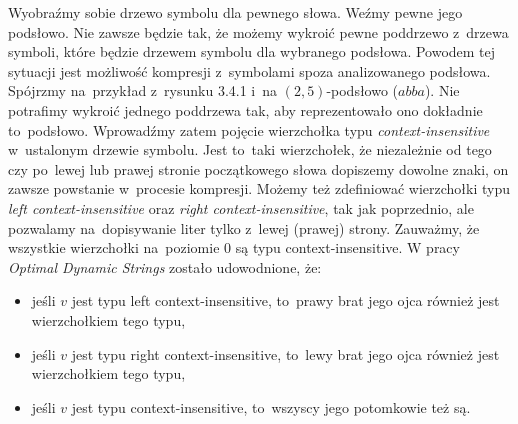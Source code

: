 \documentclass[declaration,shortabstract]{iithesis}
\theoremstyle{definition} \newtheorem{definition}{Definicja}[chapter]
\theoremstyle{remark} \newtheorem{remark}[definition]{Obserwacja}
\theoremstyle{plain} \newtheorem{theorem}[definition]{Twierdzenie}
\theoremstyle{remark} \newtheorem{example}{Przykład}[definition]
\theoremstyle{plain} \newtheorem{lemma}[definition]{Lemat}
\begin{document}
Wyobraźmy sobie drzewo symbolu dla pewnego słowa. Weźmy pewne jego podsłowo. Nie zawsze będzie tak, że możemy wykroić pewne poddrzewo z~drzewa symboli, które będzie drzewem symbolu dla wybranego podsłowa. Powodem tej sytuacji jest możliwość kompresji z~symbolami spoza analizowanego podsłowa. Spójrzmy na~przykład z~rysunku 3.4.1 i~na $(2, 5)$-podsłowo ($abba$). Nie potrafimy wykroić jednego poddrzewa tak, aby reprezentowało ono dokładnie to~podsłowo. Wprowadźmy zatem pojęcie wierzchołka typu \textit{context-insensitive} w~ustalonym drzewie symbolu. Jest to~taki wierzchołek, że niezależnie od tego czy po~lewej lub prawej stronie początkowego słowa dopiszemy dowolne znaki, on zawsze powstanie w~procesie kompresji. Możemy też zdefiniować wierzchołki typu \textit{left context-insensitive} oraz \textit{right context-insensitive}, tak jak poprzednio, ale pozwalamy na~dopisywanie liter tylko z~lewej (prawej) strony. Zauważmy, że wszystkie wierzchołki na~poziomie $0$ są typu context-insensitive. W pracy \textit{Optimal Dynamic Strings} zostało udowodnione, że:
\begin{itemize}
    \item jeśli $v$ jest typu left context-insensitive, to~prawy brat jego ojca również jest wierzchołkiem tego typu,
    \item jeśli $v$ jest typu right context-insensitive, to~lewy brat jego ojca również jest wierzchołkiem tego typu,
    \item jeśli $v$ jest typu context-insensitive, to~wszyscy jego potomkowie też są.
\end{itemize}
\end{document}
